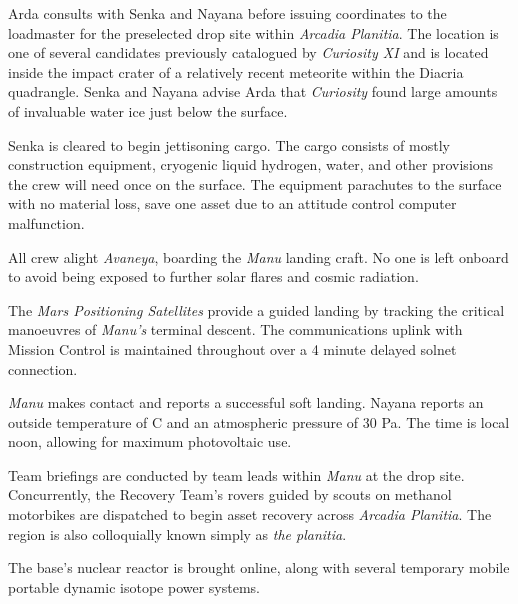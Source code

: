 

Arda consults with Senka and Nayana before issuing coordinates to the loadmaster for the preselected drop site within {\it Arcadia Planitia}. The location is one of several candidates previously catalogued by {\it Curiosity XI} and is located inside the impact crater of a relatively recent meteorite within the Diacria quadrangle. Senka and Nayana advise Arda that {\it Curiosity} found large amounts of invaluable water ice just below the surface. 

Senka is cleared to begin jettisoning cargo. The cargo consists of mostly construction equipment, cryogenic liquid hydrogen, water, and other provisions the crew will need once on the surface. The equipment parachutes to the surface with no material loss, save one asset due to an attitude control computer malfunction.
\StopTimelineDate

All crew alight {\it Avaneya}, boarding the {\it Manu} landing craft. No one is left onboard to avoid being exposed to further solar flares and cosmic radiation.

The {\it Mars Positioning Satellites} provide a guided landing by tracking the critical manoeuvres of {\it Manu's} terminal descent. The communications uplink with Mission Control is maintained throughout over a 4 minute delayed solnet connection.

{\it Manu} makes contact and reports a successful soft landing. Nayana reports an outside temperature of C and an atmospheric pressure of 30 Pa. The time is local noon, allowing for maximum photovoltaic use.

Team briefings are conducted by team leads within {\it Manu} at the drop site. Concurrently, the Recovery Team's rovers guided by scouts on methanol motorbikes are dispatched to begin asset recovery across {\it Arcadia Planitia}. The region is also colloquially known simply as {\it the planitia}.

The base's nuclear reactor is brought online, along with several temporary mobile portable dynamic isotope power systems.

